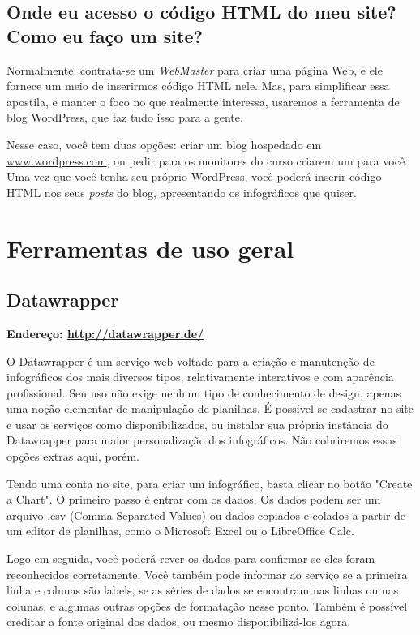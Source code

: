\documentclass[12pt,onecolumn]{article}
\begin{document}
  \subsection{Onde eu acesso o código HTML do meu site? Como eu faço um site?}
    Normalmente, contrata-se um \textit{WebMaster} para criar uma página Web, e
    ele fornece um meio de inserirmos código HTML nele. Mas, para simplificar
    essa apostila, e manter o foco no que realmente interessa, usaremos a
    ferramenta de blog WordPress, que faz tudo isso para a gente.
    
    Nesse caso, você tem duas opções: criar um blog hospedado em
    \url{www.wordpress.com}, ou pedir para os monitores do curso criarem um
    para você\footnotemark. Uma vez que você tenha seu próprio WordPress, você
    poderá inserir código HTML nos seus \textit{posts} do blog, apresentando os
    infográficos que quiser.
    

\clearpage
\section{Ferramentas de uso geral}
  \subsection{Datawrapper}
     \textbf{Endereço: \url{http://datawrapper.de/}}
    
    O Datawrapper é um serviço web voltado para a criação e manutenção de
    infográficos dos mais diversos tipos, relativamente interativos e com
    aparência profissional. Seu uso não exige nenhum tipo de conhecimento de
    design, apenas uma noção elementar de manipulação de planilhas. É possível
    se cadastrar no site e usar os serviços como disponibilizados, ou instalar
    sua própria instância do Datawrapper para maior personalização dos
    infográficos. Não cobriremos essas opções extras aqui, porém.
    
    Tendo uma conta no site, para criar um infográfico, basta clicar no botão 
    "Create a Chart". O primeiro passo é entrar com os dados. Os dados podem ser 
    um arquivo .csv (Comma Separated Values) ou dados copiados e colados a partir
    de um editor de planilhas, como o Microsoft Excel ou o LibreOffice Calc.
    
    Logo em seguida, você poderá rever os dados para confirmar se eles foram
    reconhecidos corretamente. Você também pode informar ao serviço se a primeira
    linha e colunas são labels, se as séries de dados se encontram nas linhas ou
    nas colunas, e algumas outras opções de formatação nesse ponto. Também é
    possível creditar a fonte original dos dados, ou mesmo disponibilizá-los agora.
    
\end{document}
